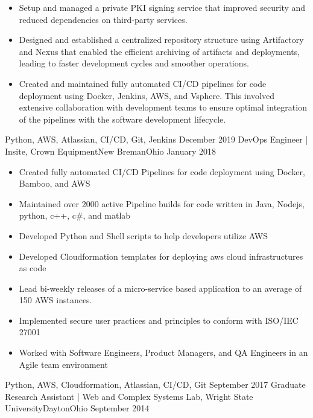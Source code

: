\begin{experiences}
{\begin{itemize}
          \item Setup and managed a private PKI signing service that improved security and reduced dependencies on third-party services.
          \item Designed and established a centralized repository structure using Artifactory and Nexus that enabled the efficient archiving of artifacts and deployments, leading to faster development cycles and smoother operations.
          \item Created and maintained fully automated CI/CD pipelines for code deployment using Docker, Jenkins, AWS, and Vsphere. This involved extensive collaboration with development teams to ensure optimal integration of the pipelines with the software development lifecycle.
      \end{itemize}
  }
  {Python, AWS, Atlassian, CI/CD, Git, Jenkins}
  \emptySeparator
  \experience
    {December 2019}   {DevOps Engineer | Insite, Crown Equipment}{New Breman}{Ohio}
    {January 2018} {
      \begin{itemize}

        \item Created fully automated CI/CD Pipelines for code deployment using Docker, Bamboo, and AWS
        \item Maintained over 2000 active Pipeline builds for code written in Java, Nodejs, python, c++, c\#, and matlab
        \item Developed Python and Shell scripts to help developers utilize AWS
        \item Developed Cloudformation templates for deploying aws cloud infrastructures as code
        \item Lead bi-weekly releases of a micro-service based application to an average of 150 AWS instances.
        \item Implemented secure user practices and principles to conform with ISO/IEC 27001
        \item Worked with Software Engineers, Product Managers, and QA Engineers in an Agile team environment
       \end{itemize}
    }
    {Python, AWS, Cloudformation, Atlassian, CI/CD, Git}
  \emptySeparator
  \experience
    {September 2017}   {Graduate Research Assistant | Web and Complex Systems Lab, Wright State University}{Dayton}{Ohio}
    {September 2014} {
      \begin{itemize}


\end{itemize}}
\end{experiences}
